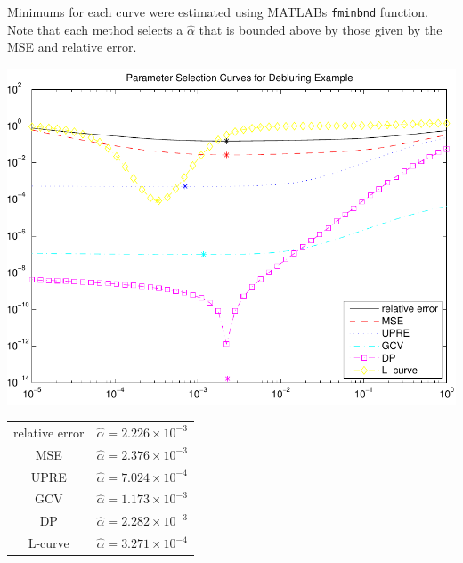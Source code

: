 \documentclass{homework}
\begin{document}
\enlargethispage{3em}
\begin{solution}
Minimums for each curve were estimated using MATLABs \texttt{fminbnd} function.  Note that each method selects a $\hat \alpha$ that is bounded above by those given by the MSE and relative error.

\begin{minipage}{.55\textwidth}
\includegraphics[width=\textwidth]{all_curves.pdf}
\end{minipage}
\begin{minipage}{.35\textwidth}
\begin{tabular}{ c c }
\hline
relative error & $\hat \alpha = 2.226\times 10^{-3}$\\
MSE & $\hat \alpha =     2.376\times 10^{-3}$\\
UPRE & $\hat \alpha =    7.024\times 10^{-4}$\\
GCV & $\hat \alpha =	    1.173\times 10^{-3}$\\
DP & $\hat \alpha =	    2.282\times 10^{-3}$\\
L-curve & $\hat \alpha = 3.271\times 10^{-4}$\\
\hline
\end{tabular}
\end{minipage}


\end{solution}
\end{document}
